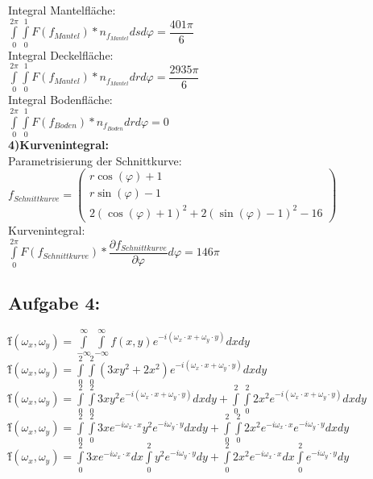 \documentclass[11pt,final]{scrreprt}
\begin{document}
Integral Mantelfläche:\\
$\int\limits_{0}^{2\pi}\int\limits_{0}^{1} F(f_{Mantel}) * n_{f_{Mantel}} dsd\varphi = \dfrac{401\pi}{6}$\\

Integral Deckelfläche:\\
$\int\limits_{0}^{2\pi}\int\limits_{0}^{1} F(f_{Mantel}) * n_{f_{Mantel}} drd\varphi = \dfrac{2935\pi}{6}$\\

Integral Bodenfläche:\\
$\int\limits_{0}^{2\pi}\int\limits_{0}^{1} F(f_{Boden}) * n_{f_{Boden}} drd\varphi = 0$\\

\textbf{4)Kurvenintegral:}\\

Parametrisierung der Schnittkurve:\\
$ f_{Schnittkurve} = \left( \begin{matrix}
r\cos(\varphi)+1\\r\sin(\varphi)-1\\2(\cos(\varphi)+1)^2+2(\sin(\varphi)-1)^2-16
\end{matrix} \right)$\\

Kurvenintegral:\\
$ \int\limits_0^{2\pi} F(f_{Schnittkurve}) * \dfrac{\partial f_{Schnittkurve}}{\partial \varphi} d\varphi = 146\pi$\\


\subsection{Aufgabe 4:}

\^{f}$(\omega_x, \omega_y) = \int\limits_{-\infty}^{\infty} \int\limits_{-\infty}^{\infty} f(x, y) e^{-i(\omega_x \cdot x + \omega_y \cdot y)} dx dy $\\
\^{f}$(\omega_x, \omega_y) = \int\limits_{0}^{2} \int\limits_{0}^{2} (3xy^2+2x^2) e^{-i(\omega_x \cdot x + \omega_y \cdot y)} dx dy $\\
\^{f}$(\omega_x, \omega_y) = \int\limits_{0}^{2} \int\limits_{0}^{2} 3xy^2 e^{-i(\omega_x \cdot x + \omega_y \cdot y)} dx dy + \int\limits_{0}^{2} \int\limits_{0}^{2} 2x^2 e^{-i(\omega_x \cdot x + \omega_y \cdot y)} dx dy $\\
\^{f}$(\omega_x, \omega_y) = \int\limits_{0}^{2} \int\limits_{0}^{2} 3x e^{-i\omega_x \cdot x} y^2e^{-i\omega_y \cdot y} dx dy + \int\limits_{0}^{2} \int\limits_{0}^{2} 2x^2 e^{-i\omega_x \cdot x}e^{-i\omega_y \cdot y} dx dy $\\
\^{f}$(\omega_x, \omega_y) = \int\limits_{0}^{2}  3x e^{-i\omega_x \cdot x}dx \int\limits_{0}^{2}y^2e^{-i\omega_y \cdot y} dy + \int\limits_{0}^{2}  2x^2 e^{-i\omega_x \cdot x}dx \int\limits_{0}^{2}e^{-i\omega_y \cdot y}dy $\\
\end{document}
